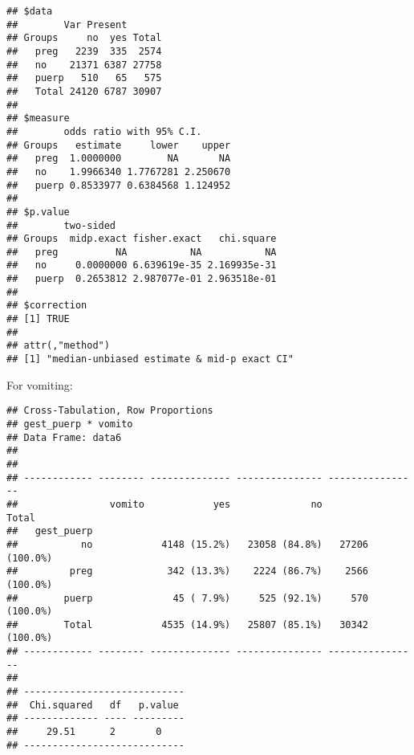 \documentclass[
]{article}
\newenvironment{Shaded}{\begin{snugshade}}{\end{snugshade}}
\newcommand{\DataTypeTok}[1]{\textcolor[rgb]{0.13,0.29,0.53}{#1}}
\newcommand{\KeywordTok}[1]{\textcolor[rgb]{0.13,0.29,0.53}{\textbf{#1}}}
\newcommand{\NormalTok}[1]{#1}
\newcommand{\OperatorTok}[1]{\textcolor[rgb]{0.81,0.36,0.00}{\textbf{#1}}}
\newcommand{\OtherTok}[1]{\textcolor[rgb]{0.56,0.35,0.01}{#1}}
\newcommand{\StringTok}[1]{\textcolor[rgb]{0.31,0.60,0.02}{#1}}
\begin{document}
\begin{verbatim}
## $data
##        Var Present
## Groups     no  yes Total
##   preg   2239  335  2574
##   no    21371 6387 27758
##   puerp   510   65   575
##   Total 24120 6787 30907
## 
## $measure
##        odds ratio with 95% C.I.
## Groups   estimate     lower    upper
##   preg  1.0000000        NA       NA
##   no    1.9966340 1.7767281 2.250670
##   puerp 0.8533977 0.6384568 1.124952
## 
## $p.value
##        two-sided
## Groups  midp.exact fisher.exact   chi.square
##   preg          NA           NA           NA
##   no     0.0000000 6.639619e-35 2.169935e-31
##   puerp  0.2653812 2.987077e-01 2.963518e-01
## 
## $correction
## [1] TRUE
## 
## attr(,"method")
## [1] "median-unbiased estimate & mid-p exact CI"
\end{verbatim}

For vomiting:

\begin{Shaded}
\end{Shaded}

\begin{verbatim}
## Cross-Tabulation, Row Proportions  
## gest_puerp * vomito  
## Data Frame: data6  
## 
## 
## ------------ -------- -------------- --------------- ----------------
##                vomito            yes              no            Total
##   gest_puerp                                                         
##           no            4148 (15.2%)   23058 (84.8%)   27206 (100.0%)
##         preg             342 (13.3%)    2224 (86.7%)    2566 (100.0%)
##        puerp              45 ( 7.9%)     525 (92.1%)     570 (100.0%)
##        Total            4535 (14.9%)   25807 (85.1%)   30342 (100.0%)
## ------------ -------- -------------- --------------- ----------------
## 
## ----------------------------
##  Chi.squared   df   p.value 
## ------------- ---- ---------
##     29.51      2       0    
## ----------------------------
\end{verbatim}

\begin{Shaded}
\end{Shaded}
\end{document}
